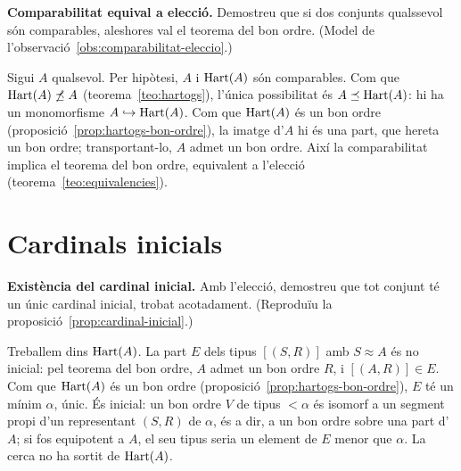 \begin{exercici}
\textbf{Comparabilitat equival a elecció.} Demostreu que si dos conjunts qualssevol són comparables, aleshores val el teorema del bon ordre. (Model de l'observació~\ref{obs:comparabilitat-eleccio}.)
\end{exercici}
\begin{solucio}
Sigui \(A\) qualsevol. Per hipòtesi, \(A\) i \(\operatorname{Hart}(A)\) són comparables. Com que \(\operatorname{Hart}(A)\not\preceq A\) (teorema~\ref{teo:hartogs}), l'única possibilitat és \(A\preceq\operatorname{Hart}(A)\): hi ha un monomorfisme \(A\hookrightarrow\operatorname{Hart}(A)\). Com que \(\operatorname{Hart}(A)\) és un bon ordre (proposició~\ref{prop:hartogs-bon-ordre}), la imatge d'\(A\) hi és una part, que hereta un bon ordre; transportant-lo, \(A\) admet un bon ordre. Així la comparabilitat implica el teorema del bon ordre, equivalent a l'elecció (teorema~\ref{teo:equivalencies}).
\end{solucio}

\section{Cardinals inicials}\label{prac:cardinals-inicials}

\begin{exercici}
\textbf{Existència del cardinal inicial.} Amb l'elecció, demostreu que tot conjunt té un únic cardinal inicial, trobat acotadament. (Reproduïu la proposició~\ref{prop:cardinal-inicial}.)
\end{exercici}
\begin{solucio}
Treballem dins \(\operatorname{Hart}(A)\). La part \(E\) dels tipus \([(S,R)]\) amb \(S\approx A\) és no inicial: pel teorema del bon ordre, \(A\) admet un bon ordre \(R\), i \([(A,R)]\in E\). Com que \(\operatorname{Hart}(A)\) és un bon ordre (proposició~\ref{prop:hartogs-bon-ordre}), \(E\) té un mínim \(\alpha\), únic. És inicial: un bon ordre \(V\) de tipus \(<\alpha\) és isomorf a un segment propi d'un representant \((S,R)\) de \(\alpha\), és a dir, a un bon ordre sobre una part d'\(A\); si fos equipotent a \(A\), el seu tipus seria un element de \(E\) menor que \(\alpha\). La cerca no ha sortit de \(\operatorname{Hart}(A)\).
\end{solucio}

